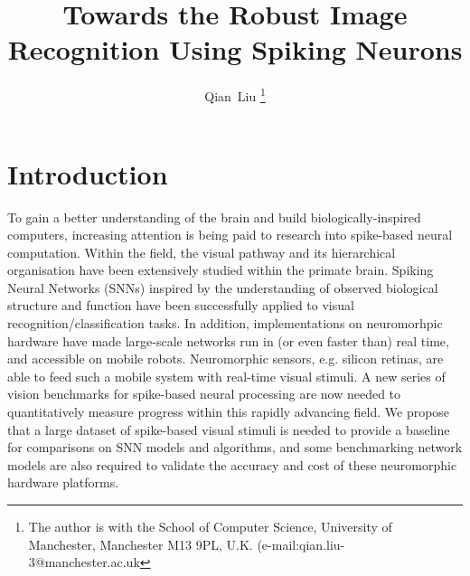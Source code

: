 \documentclass[journal]{journal}
\begin{document}
	\title{Towards the Robust Image Recognition Using Spiking Neurons}
	\author{
	Qian~Liu
	\thanks{
	The author is with the School of Computer Science, University of Manchester, Manchester M13 9PL, U.K. 
	(e-mail:qian.liu-3@manchester.ac.uk}
	}
	\maketitle
	\thispagestyle{empty}

\begin{abstract}

\end{abstract}

\section{Introduction}
	To gain a better understanding of the brain and build biologically-inspired computers, increasing attention is being paid to research into spike-based neural computation.
	Within the field, the visual pathway and its hierarchical organisation have been extensively studied within the primate brain.
	Spiking Neural Networks (SNNs) inspired by the understanding of observed biological structure and function have been successfully applied to visual recognition/classification tasks.
	In addition, implementations on neuromorhpic hardware have made large-scale networks run in (or even faster than) real time, and accessible on mobile robots.
	Neuromorphic sensors, e.g. silicon retinas, are able to feed such a mobile system with real-time visual stimuli.
	A new series of vision benchmarks for spike-based neural processing are now needed to quantitatively measure progress within this rapidly advancing field.
	We propose that a large dataset of spike-based visual stimuli is needed to provide a baseline for comparisons on SNN models and algorithms, and some benchmarking network models are also required to validate the accuracy and cost of these neuromorphic hardware platforms.
	
\end{document}
